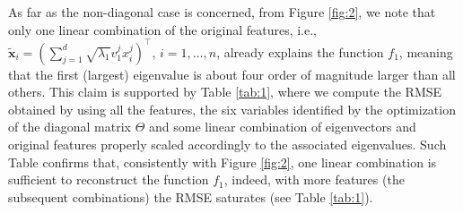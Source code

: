 \documentclass[hyphens,a4paper,11pt]{article}
\newcommand{\mTheta}{\mathsf{\Theta}}
\begin{document}
As far as the non-diagonal case is concerned, from Figure  \ref{fig:2}, we note that only one linear combination of the original features, i.e., $\tilde{\boldsymbol{x}}_i = \left( \sum_{j=1}^d \sqrt{\lambda_1}v_1^j{{x}}_{i}^j\right)^{\intercal}$, $i=1,\ldots,n$, already explains the function $f_1$, meaning that the first (largest) eigenvalue is about four order of magnitude larger than all others. This claim is supported by Table \ref{tab:1}, where we compute the RMSE obtained by using all the features, the six variables identified by the optimization of the diagonal matrix $\mTheta$ and some linear combination of eigenvectors and original features properly scaled accordingly to the associated eigenvalues. Such Table confirms that, consistently with Figure \ref{fig:2}, one linear combination is sufficient to reconstruct the function $f_1$, indeed, with more features (the subsequent combinations) the RMSE saturates (see Table \ref{tab:1}).
\end{document}

